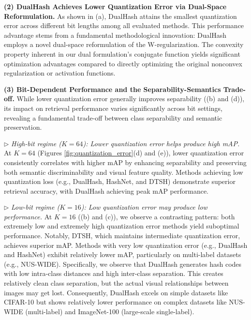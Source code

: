 {\noindent\textbf{(2) DualHash Achieves Lower Quantization Error via Dual-Space Reformulation.}
As shown in (a), DualHash attains the smallest quantization error across different bit lengths among all evaluated methods. This performance advantage stems from a fundamental methodological innovation: DualHash employs a novel dual-space reformulation of the W-regularization. The convexity property inherent in our dual formulation's conjugate function yields significant optimization advantages compared to directly optimizing the original nonconvex regularization or activation functions.}

\noindent\textbf{(3) Bit-Dependent Performance and the Separability-Semantics Trade-off.}
While lower quantization error generally improves separability ((b) and (d)), its impact on retrieval performance varies significantly across bit settings, revealing a fundamental trade-off between class separability and semantic preservation.

\noindent\(\triangleright\) \textit{High-bit regime ($K = 64$): Lower quantization error helps  produce high mAP.}
At $K = 64$ (Figures \ref{fig:quantization_error}(d) and (e)), lower quantization error consistently correlates with higher mAP by enhancing separability and preserving both semantic discriminability and visual feature quality. Methods achieving low quantization loss (e.g., DualHash, HashNet, and DTSH) demonstrate superior retrieval accuracy, with DualHash achieving peak mAP performance.

\noindent\(\triangleright\) \textit{Low-bit regime ($K = 16$): Low quantization error may produce low performance.}
At $K = 16$ ((b) and (c)), we observe a contrasting pattern: both extremely low and extremely high quantization error methods yield suboptimal performance. Notably, DTSH, which maintains intermediate quantization error, achieves superior mAP. Methods with very low quantization error (e.g., DualHash and HashNet) exhibit relatively lower mAP, particularly on multi-label datasets (e.g., NUS-WIDE). Specifically, we observe that  DualHash generates hash codes with low intra-class distances and high inter-class separation. This creates relatively clean class separation, but the actual visual relationships between images may get lost. Consequently, DualHash excels on simple datasets like CIFAR-10 but shows relatively lower performance on complex datasets like NUS-WIDE (multi-label) and ImageNet-100 (large-scale single-label).


\endgroup
